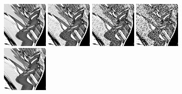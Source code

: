 \documentclass[10pt, journal, twocolumn, final, a4paper]{IEEEtran}
\begin{document}
\begin{figure}[thpb!]
	\begin{center}
		\includegraphics[width=0.2\textwidth]{figs/temporal_slices/slice_mobile_mono_orig_row220_col040-180_fra080-220.png}%
		\includegraphics[width=0.2\textwidth]{figs/temporal_slices/slice_mobile_mono_nisy_s10_row220_col040-180_fra080-220.png}%
		\includegraphics[width=0.2\textwidth]{figs/temporal_slices/slice_mobile_mono_nisy_s20_row220_col040-180_fra080-220.png}%
		\includegraphics[width=0.2\textwidth]{figs/temporal_slices/slice_mobile_mono_nisy_s40_row220_col040-180_fra080-220.png}\\
		               \hspace{0.2\textwidth}%
		\includegraphics[width=0.2\textwidth]{figs/temporal_slices/slice_mobile_mono_bm4d_s10_row220_col040-180_fra080-220.png}%

\end{center}
\end{figure}
\end{document}
